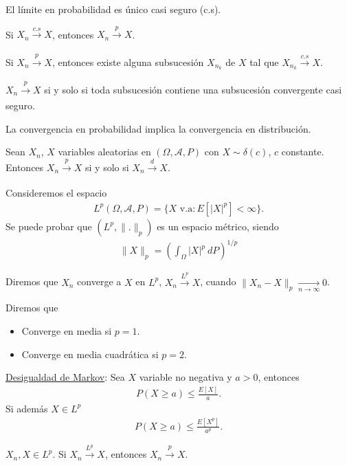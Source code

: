 \begin{teo}
    El límite en probabilidad es único casi seguro (c.s).
\end{teo}

\begin{teo}
    Si $X_n \xrightarrow[]{c.s} X$, entonces $X_n \xrightarrow[]{p} X$.
\end{teo}

\begin{teo}
    Si $X_n \xrightarrow[]{p} X$, entonces existe alguna subsucesión $X_{n_k}$ de $X$ tal que $X_{n_k} \xrightarrow[]{c.s} X$.
\end{teo}

\begin{teo}
    $X_n \xrightarrow[]{p} X$ si y solo si toda subsucesión contiene una subsucesión convergente casi seguro.
\end{teo}

\begin{teo}
    La convergencia en probabilidad implica la convergencia en distribución.
\end{teo}

\begin{teo}
    Sean $X_n$, $X$ variables aleatorias en $(\Omega, \mathcal{A}, P)$ con $X \sim \delta(c)$, $c$ constante. Entonces $X_n \xrightarrow[]{p} X$ si y solo si $X_n \xrightarrow[]{d} X$.
\end{teo}

\noindent Consideremos el espacio 
\begin{align*}
    L^p(\Omega, \mathcal{A}, P) = \{ X \text{ v.a} : E[|X|^p] < \infty \}.
\end{align*}
Se puede probar que $(L^p, \|.\|_p)$ es un espacio métrico, siendo 
\begin{align*}
    \|X \|_p = \left( \int_{\Omega} |X|^p \ dP \right)^{1/p}
\end{align*}

\begin{defi}
    Diremos que $X_n$ converge a $X$ en $L^p$, $X_n \xrightarrow[]{L^p} X$, cuando $\|X_n - X\|_p \xrightarrow[n \to \infty]{} 0$.
\end{defi}
\noindent Diremos que
\begin{itemize}
    \item Converge en media si $p = 1$.
    \item Converge en media cuadrática si $p = 2$.
\end{itemize}
\noindent \underline{Desigualdad de Markov}: Sea $X$ variable no negativa y $a>0$, entonces
\begin{align*}
    P(X \ge a) \leq \frac{E[X]}{a}.
\end{align*}
\noindent Si además $X \in L^p$
\begin{align*}
    P(X \ge a) \leq \frac{E[X^p]}{a^p}.
\end{align*}
\begin{teo}
    $X_n, X \in L^p$. Si $X_n \xrightarrow[]{L^p} X$, entonces $X_n \xrightarrow[]{p} X$.
\end{teo}

